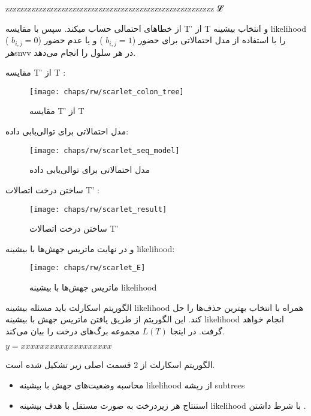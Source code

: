 zzzzzzzzzzzzzzzzzzzzzzzzzzzzzzzzzzzzzzzzzzzzzzzzzzzzzzzz
𝓛

از خطاهای احتمالی حساب میکند. سپس با مقایسه T’ از T و انتخاب بیشینه  \gls{likelihood}  را با استفاده از مدل احتمالاتی برای حضور ($b_{i,j} = 1$ )  و یا عدم حضور ($b_{i,j} = 0$ ) هر\gls{snvv} در هر سلول را انجام می‌دهد. 

مقایسه T’ از T :
\begin{figure}[!ht]
	\centerline{\texttt{[image: chaps/rw/scarlet\_colon\_tree]}}
	\caption{مقایسه T’ از T}
	\label{fig:ch_rw:scarlet_colon_tree}
\end{figure}

مدل احتمالاتی برای توالی‌یابی داده:

\begin{figure}[!ht]
	\centerline{\texttt{[image: chaps/rw/scarlet\_seq\_model]}}
	\caption{مدل احتمالاتی برای توالی‌یابی داده}
	\label{fig:ch_rw:scarlet_seq_model}
\end{figure}

ساختن درخت اتصالات T’ : 

\begin{figure}[!ht]
	\centerline{\texttt{[image: chaps/rw/scarlet\_result]}}
	\caption{ساختن درخت اتصالات T’}
	\label{fig:ch_rw:scarlet_result}
\end{figure}

و  در نهایت ماتریس جهش‌ها   با بیشینه \gls{likelihood}: 


\begin{figure}[!ht]
	\centerline{\texttt{[image: chaps/rw/scarlet\_E]}}
	\caption{ماتریس جهش‌ها  با بیشینه \gls{likelihood}}
	\label{fig:ch_rw:scarlet_E}
\end{figure}


الگوریتم اسکارلت باید مسئله بیشینه \gls{likelihood} همراه با  انتخاب بهترین حذف‌ها را حل کند. این الگوریتم از طریق یافتن ماتریس جهش با بیشینه \gls{likelihood}  انجام خواهد گرفت. در اینجا $L(T)$
مجموعه برگ‌های درخت  را بیان می‌کند. 


\begin{math}
	y=xxxxxxxxxxxxxxxxxxx
\end{math}

الگوریتم اسکارلت از 2 قسمت اصلی زیر تشکیل شده است. 

\begin{itemize}
	\item      محاسبه وضعیت‌های جهش با بیشینه \gls{likelihood}  از ریشه \gls{subtrees} 
	\item استنتاج هر زیردرخت به صورت مستقل با هدف بیشینه \gls{likelihood} با شرط داشتن  .
\end{itemize}

